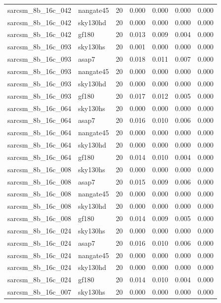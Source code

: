 \begin{tabular}{llrrrrr}
sarcsm\_8b\_16c\_042 & nangate45 & 20 & 0.000 & 0.000 & 0.000 & 0.000 \\
sarcsm\_8b\_16c\_042 & sky130hd & 20 & 0.000 & 0.000 & 0.000 & 0.000 \\
sarcsm\_8b\_16c\_042 & gf180 & 20 & 0.013 & 0.009 & 0.004 & 0.000 \\
sarcsm\_8b\_16c\_093 & sky130hs & 20 & 0.001 & 0.000 & 0.000 & 0.000 \\
sarcsm\_8b\_16c\_093 & asap7 & 20 & 0.018 & 0.011 & 0.007 & 0.000 \\
sarcsm\_8b\_16c\_093 & nangate45 & 20 & 0.000 & 0.000 & 0.000 & 0.000 \\
sarcsm\_8b\_16c\_093 & sky130hd & 20 & 0.000 & 0.000 & 0.000 & 0.000 \\
sarcsm\_8b\_16c\_093 & gf180 & 20 & 0.017 & 0.012 & 0.005 & 0.000 \\
sarcsm\_8b\_16c\_064 & sky130hs & 20 & 0.000 & 0.000 & 0.000 & 0.000 \\
sarcsm\_8b\_16c\_064 & asap7 & 20 & 0.016 & 0.010 & 0.006 & 0.000 \\
sarcsm\_8b\_16c\_064 & nangate45 & 20 & 0.000 & 0.000 & 0.000 & 0.000 \\
sarcsm\_8b\_16c\_064 & sky130hd & 20 & 0.000 & 0.000 & 0.000 & 0.000 \\
sarcsm\_8b\_16c\_064 & gf180 & 20 & 0.014 & 0.010 & 0.004 & 0.000 \\
sarcsm\_8b\_16c\_008 & sky130hs & 20 & 0.000 & 0.000 & 0.000 & 0.000 \\
sarcsm\_8b\_16c\_008 & asap7 & 20 & 0.015 & 0.009 & 0.006 & 0.000 \\
sarcsm\_8b\_16c\_008 & nangate45 & 20 & 0.000 & 0.000 & 0.000 & 0.000 \\
sarcsm\_8b\_16c\_008 & sky130hd & 20 & 0.000 & 0.000 & 0.000 & 0.000 \\
sarcsm\_8b\_16c\_008 & gf180 & 20 & 0.014 & 0.009 & 0.005 & 0.000 \\
sarcsm\_8b\_16c\_024 & sky130hs & 20 & 0.000 & 0.000 & 0.000 & 0.000 \\
sarcsm\_8b\_16c\_024 & asap7 & 20 & 0.016 & 0.010 & 0.006 & 0.000 \\
sarcsm\_8b\_16c\_024 & nangate45 & 20 & 0.000 & 0.000 & 0.000 & 0.000 \\
sarcsm\_8b\_16c\_024 & sky130hd & 20 & 0.000 & 0.000 & 0.000 & 0.000 \\
sarcsm\_8b\_16c\_024 & gf180 & 20 & 0.014 & 0.010 & 0.004 & 0.000 \\
sarcsm\_8b\_16c\_007 & sky130hs & 20 & 0.000 & 0.000 & 0.000 & 0.000 \\

\end{tabular}
